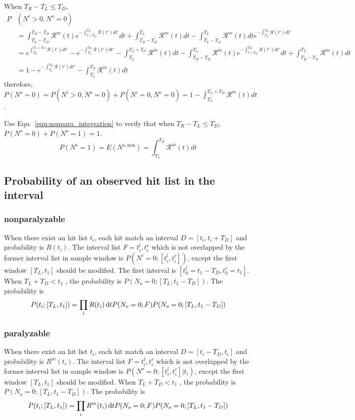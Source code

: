 When $T_R-T_L\leq T_D$,
\begin{equation}
\begin{aligned}
P&(N^i>0,N^o=0)\\
&=\int_{T_L-T_D}^{T_R-T_D}{\mathcal{R}^m(t)e^{-\int_{t+T_D}^{T_R}{\mathcal{R}(t')dt'}}dt}+\int_{T_R-T_D}^{T_L}{\mathcal{R}^m(t)dt}-\int_{T_L-T_D}^{T_L}{\mathcal{R}^m(t)dt}e^{-\int_{T_L}^{T_R}{\mathcal{R}(t')dt'}}\\
&= e^{\int_{T_R}^{T_L+T_D}{\mathcal{R}(t')dt'}} - e^{-\int_{T_L}^{T_R}{\mathcal{R}(t')dt'}}-\int_{T_L}^{T_L+T_D}{\mathcal{R}^m(t)dt}-\int_{T_R-T_D}^{T_L}{\mathcal{R}^m(t)e^{-\int_{t+T_D}^{T_R}{\mathcal{R}(t')dt'}}dt}+\int_{T_R-T_D}^{T_L}{\mathcal{R}^m(t)dt}\\
&= 1 - e^{-\int_{T_L}^{T_R}{\mathcal{R}(t')dt'}}-\int_{T_L}^{T_R}{\mathcal{R}^m(t)dt}
\end{aligned}
\end{equation}
therefore, $P(N^o=0)=P(N^i>0,N^o=0)+P(N^i=0,N^o=0)=1-\int_{T_L}^{T_L+T_D}{\mathcal{R}^m(t)dt}$.

Use Equ.~\eqref{equ:nonpara_integration} to verify that when $T_R-T_L\leq T_D$, $P(N^o=0)+P(N^o=1)=1$.
\begin{equation}
P(N^o=1)=E(N^{o,\mathrm{non}})=\int_{T_L}^{T_R}{\mathcal{R}^m(t)dt}
\end{equation}

\subsection{Probability of an observed hit list in the interval}
\subsubsection{nonparalyzable}
When there exist an hit list ${t_i}$, each hit match an interval $D={[t_i,t_i+T_D]}$ and probability is $R(t_i)$. The interval list $F={t_i^l,t_i^r}$ which is not overlapped by the former interval list in sample window is $P(N^i=0;[t_i^l,t_i^r])$, except the first window $[T_L, t_1]$ should be modified. The first interval is $[t_0^l=t_1-T_D, t_0^r=t_1]$. When $T_L+T_D<t_1$ , the probability is $P(N_o=0;[T_L, t_1-T_D])$. The probability is 
\begin{equation}
P({t_i};[T_L,t_1])=\prod_i{R(t_i)\mathop{}\!\mathrm{d} t}P(N_o=0;F)P(N_o=0;[T_L, t_1-T_D])
\end{equation}
\subsubsection{paralyzable}
When there exist an hit list ${t_i}$, each hit match an interval $D={[t_i-T_D,t_i]}$ and probability is $R^m(t_i)$. The interval list $F={t_i^l,t_i^r}$ which is not overlapped by the former interval list in sample window is $P(N^o=0;[t_i^l,t_i^r]|t_i)$, except the first window $[T_L, t_1]$ should be modified.  When $T_L+T_D<t_1$ , the probability is $P(N_o=0;[T_L, t_1-T_D])$. The probability is 
\begin{equation}
P({t_i};[T_L,t_1])=\prod_i{R^m(t_i)\mathop{}\!\mathrm{d} t}P(N_o=0;F)P(N_o=0;[T_L, t_1-T_D])
\end{equation}

